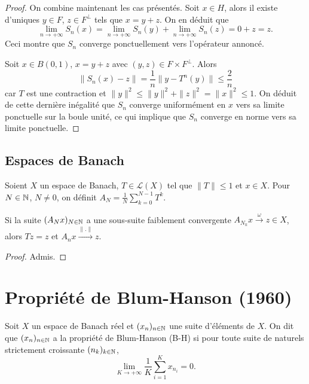 \begin{proof}
  On combine maintenant les cas présentés. Soit $x\in H$, alors il existe
  d'uniques $y\in F$, $z\in F^{\perp}$ tels que $x = y + z$. On en déduit que
  $$\lim_{n\to+\infty}S_n(x) =
  \lim_{n\to+\infty}S_n(y) + \lim_{n\to+\infty}S_n(z)=
  0 + z = z.$$
  Ceci montre que $S_n$ converge ponctuellement vers l'opérateur annoncé.


  Soit $x\in B(0, 1)$, $x = y + z$ avec $(y, z)\in F\times F^\perp$.
  Alors $$\|S_n(x) - z \| = \frac{1}{n}\|y- T^n(y)\| \leq \frac{2}{n}$$
  car $T$ est une contraction et
  $\|y\|^2\leq \|y\|^2 + \|z\|^2 = \|x\|^2 \leq 1$. On déduit de cette
  dernière inégalité que $S_n$ converge uniformément en $x$ vers sa limite
  ponctuelle sur la boule
  unité, ce qui implique que $S_n$ converge en norme vers sa limite ponctuelle.
\end{proof}

\subsection{Espaces de Banach}
\begin{thm}
  Soient $X$ un espace de Banach, $T\in\mathcal L(X)$ tel que $\|T\|\leq 1$
  et $x\in X$. Pour $N\in\mathbb{N}$, $N\neq 0$, on définit
  $A_N = \frac{1}{N}\sum_{k=0}^{N-1}T^k$.

  Si la suite $(A_Nx)_{N\in\mathbb{N}}$ a une sous-suite faiblement convergente
  $A_{N_k}x\xrightarrow{\omega}z\in X$, alors $Tz = z$ et
  $A_nx \xrightarrow{\|.\|} z$.
\end{thm}
\begin{proof}
  Admis.
\end{proof}
\section{Propriété de Blum-Hanson (1960)}
\begin{df}
  Soit $X$ un espace de Banach réel et $(x_n)_{n\in\mathbb{N}}$ une suite d'éléments de
  $X$. On dit que $(x_n)_{n\in\mathbb{N}}$ a la propriété de Blum-Hanson (B-H) si
  pour toute suite de naturels strictement croissante $(n_k)_{k\in\mathbb{N}}$,
  $$\lim_{K\to+\infty}\frac{1}{K}\sum_{i=1}^Kx_{n_i} = 0.$$
\end{df}


